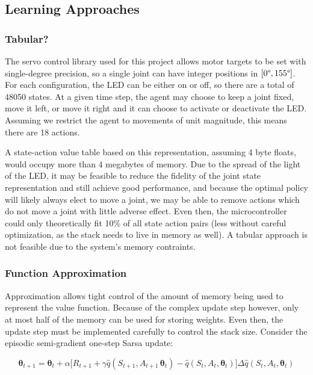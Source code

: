 \documentclass{article}
\begin{document}
	
	\subsection{Learning Approaches}
	
	\subsubsection{Tabular?}
	
	The servo control library used for this project allows motor targets to be set with single-degree precision, so a single joint can have integer positions in  $[0\degree, 155\degree]$. For each configuration, the LED can be either on or off, so there are a total of 48050 states. At a given time step, the agent may choose to keep a joint fixed, move it left, or move it right and it can choose to activate or deactivate the LED. Assuming we restrict the agent to movements of unit magnitude, this means there are 18 actions.

	A state-action value table based on this representation, assuming 4 byte floats, would occupy more than 4 megabytes of memory. Due to the spread of the light of the LED, it may be feasible to reduce the fidelity of the joint state representation and still achieve good performance, and because the optimal policy will likely always elect to move a joint, we may be able to remove actions which do not move a joint with little adverse effect. Even then, the microcontroller could only theoretically fit 10\% of all state action pairs (less without careful optimization, as the stack needs to live in memory as well). A tabular approach is not feasible due to the system's memory contraints.
	
	\subsubsection{Function Approximation}
	
	Approximation allows tight control of the amount of memory being used to represent the value function. Because of the complex update step however, only at most half of the memory can be used for storing weights. Even then, the update step must be implemented carefully to control the stack size. Consider the episodic semi-gradient one-step Sarsa update:
	
	\begin{equation}\label{eqn:update}
	\bm{\theta}_{t+1} = 
	\bm{\theta}_t + 
	\alpha \Big[
		R_{t+1} + 
		\gamma \hat{q}(S_{t+1}, A_{t+1}\, \bm{\theta}_t) 
		- \hat{q}(S_t, A_t, \bm{\theta}_t)
	\Big]
	\Delta\hat{q}(S_t, A_t, \bm{\theta}_t)\tag{1}
	\end{equation}
	
\end{document}
